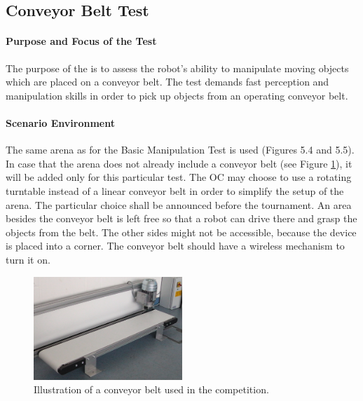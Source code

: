 \newpage
\subsection{Conveyor Belt Test}


\paragraph{Purpose and Focus of the Test}
The purpose of the  is to assess the robot’s ability to manipulate moving objects which are placed on a conveyor belt. The test demands fast perception and manipulation skills in order to pick up objects from an operating conveyor belt.

\paragraph{Scenario Environment}
The same arena as for the Basic Manipulation Test is used (Figures 5.4 and 5.5). In case that the arena does not already include a conveyor belt (see Figure \ref{fig:conveyor_belt}), it will be added only for this particular test.
The OC may choose to use a rotating turntable instead of a linear conveyor belt in order to simplify the setup of the arena. The particular choice shall be announced before the tournament.
An area besides the conveyor belt is left free so that a robot can drive there and grasp the objects from the belt. The other sides might not be accessible, because the device is placed into a corner. 
The conveyor belt should have a wireless mechanism to turn it on. 

\begin{figure} [h!]
\centering
\includegraphics[width=0.5\textwidth ]{../images/conveyor_belt.jpg}
\caption{Illustration of a conveyor belt used in the competition.}
\label{fig:conveyor_belt}
\end{figure}



